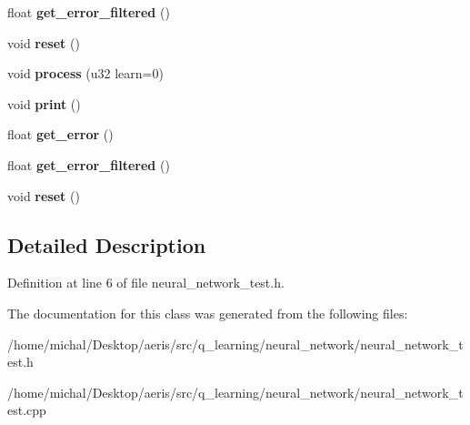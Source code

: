\begin{DoxyCompactItemize}
\item 
\hypertarget{classCNeuralNetworkTest_a2f47abbe377dc9f7332e80810ffbe83c}{float {\bfseries get\-\_\-error\-\_\-filtered} ()}\label{classCNeuralNetworkTest_a2f47abbe377dc9f7332e80810ffbe83c}

\item 
\hypertarget{classCNeuralNetworkTest_adbae2092b29d885acca7e2ee4e5e9434}{void {\bfseries reset} ()}\label{classCNeuralNetworkTest_adbae2092b29d885acca7e2ee4e5e9434}

\item 
\hypertarget{classCNeuralNetworkTest_aec375092f4b240bbd835e32616f90342}{void {\bfseries process} (u32 learn=0)}\label{classCNeuralNetworkTest_aec375092f4b240bbd835e32616f90342}

\item 
\hypertarget{classCNeuralNetworkTest_a1a6a10238372e72bc8dd53f661ae0f45}{void {\bfseries print} ()}\label{classCNeuralNetworkTest_a1a6a10238372e72bc8dd53f661ae0f45}

\item 
\hypertarget{classCNeuralNetworkTest_afe99dc3b234a360934ead8264e2f6ec4}{float {\bfseries get\-\_\-error} ()}\label{classCNeuralNetworkTest_afe99dc3b234a360934ead8264e2f6ec4}

\item 
\hypertarget{classCNeuralNetworkTest_a2f47abbe377dc9f7332e80810ffbe83c}{float {\bfseries get\-\_\-error\-\_\-filtered} ()}\label{classCNeuralNetworkTest_a2f47abbe377dc9f7332e80810ffbe83c}

\item 
\hypertarget{classCNeuralNetworkTest_adbae2092b29d885acca7e2ee4e5e9434}{void {\bfseries reset} ()}\label{classCNeuralNetworkTest_adbae2092b29d885acca7e2ee4e5e9434}

\end{DoxyCompactItemize}


\subsection{Detailed Description}


Definition at line 6 of file neural\-\_\-network\-\_\-test.\-h.



The documentation for this class was generated from the following files\-:\begin{DoxyCompactItemize}
\item 
/home/michal/\-Desktop/aeris/src/q\-\_\-learning/neural\-\_\-network/neural\-\_\-network\-\_\-test.\-h\item 
/home/michal/\-Desktop/aeris/src/q\-\_\-learning/neural\-\_\-network/neural\-\_\-network\-\_\-test.\-cpp\end{DoxyCompactItemize}
